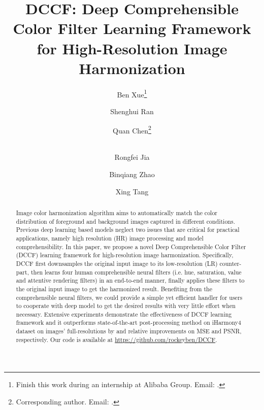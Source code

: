 \documentclass[runningheads]{llncs}
\begin{document}
\pagestyle{headings}
\mainmatter
\def\ECCVSubNumber{5142}  

\title{DCCF: Deep Comprehensible Color Filter Learning Framework for High-Resolution Image Harmonization} 

\begin{comment}
\titlerunning{ECCV-22 submission ID \ECCVSubNumber} 
\authorrunning{ECCV-22 submission ID \ECCVSubNumber} 
\author{Anonymous ECCV submission}
\institute{Paper ID \ECCVSubNumber}
\end{comment}


\author{Ben Xue\thanks{Finish this work during an internship at Alibaba Group. Email: .}\and
Shenghui Ran \and
Quan Chen\thanks{Corresponding author. Email: . }\and \\
Rongfei Jia\and
Binqiang Zhao\and
Xing Tang\\
}
\maketitle


\begin{abstract}


    Image color harmonization algorithm aims to automatically match the color distribution of foreground and background images captured in different conditions.
    Previous deep learning based models neglect two issues that are critical for practical applications, namely high resolution (HR) image processing and model comprehensibility.
    In this paper, we propose a novel Deep Comprehensible Color Filter (DCCF) learning framework for high-resolution image harmonization.
    Specifically, DCCF first downsamples the original input image to its low-resolution (LR) counter-part, then learns four human comprehensible neural filters (i.e. hue, saturation, value and attentive rendering filters) in an end-to-end manner, finally applies these filters to the original input image to get the harmonized result.
    Benefiting from the comprehensible neural filters, we could provide a simple yet efficient handler for users to cooperate with deep model to get the desired results with very little effort when necessary.
    Extensive experiments demonstrate the effectiveness of DCCF learning framework and it outperforms state-of-the-art post-processing method on iHarmony4 dataset on images' full-resolutions by  and  relative improvements on MSE and PSNR, respectively. Our code is available at \url{https://github.com/rockeyben/DCCF}.
    
    
    
    \end{abstract}
    
\end{document}
